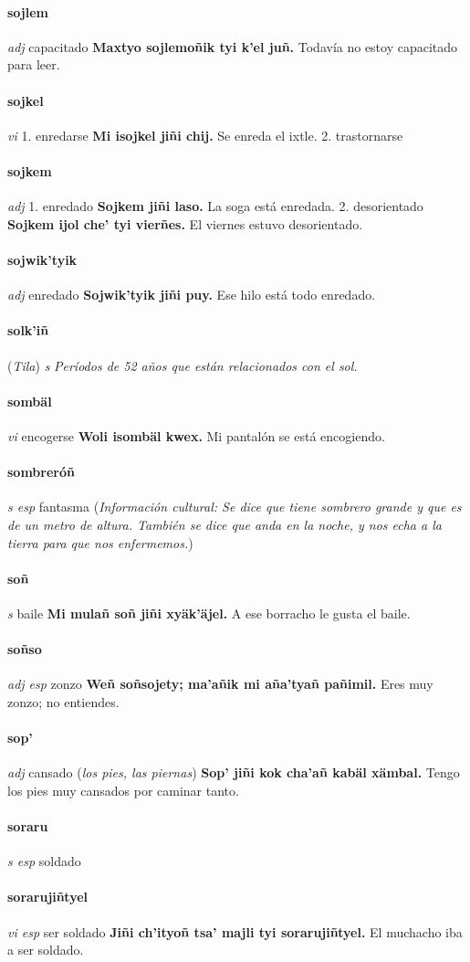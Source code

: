 \documentclass{scrbook}
\newcommand{\entry}[1]{\paragraph{#1}}
\newcommand{\onedefinition}[1]{#1.}
\newcommand{\nontranslationdef}[1]{\textit{#1}}
\newcommand{\partofspeech}[1]{\textit{#1}}
\newcommand{\spanishtranslation}[1]{#1}
\newcommand{\clarification}[1]{(\textit{#1})}
\newcommand{\cholexample}[1]{\textbf{#1}}
\newcommand{\exampletranslation}[1]{#1}
\newcommand{\relevantdialect}[1]{(\textit{#1})}
\newcommand{\culturalinformation}[1]{(\textit{#1})}
\begin{document}
\begin{multicols}{2}
\entry{sojlem}
\partofspeech{adj}
\spanishtranslation{capacitado}
\cholexample{Maxtyo sojlemoñik tyi k'el juñ.}
\exampletranslation{Todavía no estoy capacitado para leer.}

\entry{sojkel}
\partofspeech{vi}
\onedefinition{1}
\spanishtranslation{enredarse}
\cholexample{Mi isojkel jiñi chij.}
\exampletranslation{Se enreda el ixtle.}
\onedefinition{2}
\spanishtranslation{trastornarse}

\entry{sojkem}
\partofspeech{adj}
\onedefinition{1}
\spanishtranslation{enredado}
\cholexample{Sojkem jiñi laso.}
\exampletranslation{La soga está enredada.}
\onedefinition{2}
\spanishtranslation{desorientado}
\cholexample{Sojkem ijol che' tyi vierñes.}
\exampletranslation{El viernes estuvo desorientado.}

\entry{sojwik'tyik}
\partofspeech{adj}
\spanishtranslation{enredado}
\cholexample{Sojwik'tyik jiñi puy.}
\exampletranslation{Ese hilo está todo enredado.}

\entry{solk'iñ}
\relevantdialect{Tila}
\partofspeech{s}
\nontranslationdef{Períodos de 52 años que están relacionados con el sol.}

\entry{sombäl}
\partofspeech{vi}
\spanishtranslation{encogerse}
\cholexample{Woli isombäl kwex.}
\exampletranslation{Mi pantalón se está encogiendo.}

\entry{sombreróñ}
\partofspeech{s esp}
\spanishtranslation{fantasma}
\culturalinformation{Información cultural: Se dice que tiene sombrero grande y que es de un metro de altura. También se dice que anda en la noche, y nos echa a la tierra para que nos enfermemos.}

\entry{soñ}
\partofspeech{s}
\spanishtranslation{baile}
\cholexample{Mi mulañ soñ jiñi xyäk'äjel.}
\exampletranslation{A ese borracho le gusta el baile.}

\entry{soñso}
\partofspeech{adj esp}
\spanishtranslation{zonzo}
\cholexample{Weñ soñsojety; ma'añik mi aña'tyañ pañimil.}
\exampletranslation{Eres muy zonzo; no entiendes.}

\entry{sop'}
\partofspeech{adj}
\spanishtranslation{cansado}
\clarification{los pies, las piernas}
\cholexample{Sop' jiñi kok cha'añ kabäl xämbal.}
\exampletranslation{Tengo los pies muy cansados por caminar tanto.}

\entry{soraru}
\partofspeech{s esp}
\spanishtranslation{soldado}

\entry{sorarujiñtyel}
\partofspeech{vi esp}
\spanishtranslation{ser soldado}
\cholexample{Jiñi ch'ityoñ tsa' majli tyi sorarujiñtyel.}
\exampletranslation{El muchacho iba a ser soldado.}


\end{multicols}
\end{document}
